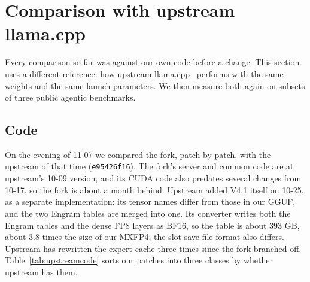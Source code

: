 \documentclass[11pt,a4paper]{article}
\newcommand{\code}[1]{\texttt{#1}}
\begin{document}
\section{Comparison with upstream llama.cpp}
\label{sec:upstream}

Every comparison so far was against our own code before a change. This section uses a different reference: how upstream llama.cpp~\cite{llamacpp} performs with the same weights and the same launch parameters. We then measure both again on subsets of three public agentic benchmarks.

\subsection{Code}
\label{sec:upstreamcode}

On the evening of 11-07 we compared the fork, patch by patch, with the upstream of that time (\code{e95426f16}). The fork's server and common code are at upstream's 10-09 version, and its CUDA code also predates several changes from 10-17, so the fork is about a month behind. Upstream added V4.1 itself on 10-25, as a separate implementation: its tensor names differ from those in our GGUF, and the two Engram tables are merged into one. Its converter writes both the Engram tables and the dense FP8 layers as BF16, so the table is about 393 GB, about 3.8 times the size of our MXFP4; the slot save file format also differs. Upstream has rewritten the expert cache three times since the fork branched off. Table~\ref{tab:upstreamcode} sorts our patches into three classes by whether upstream has them.
\end{document}
